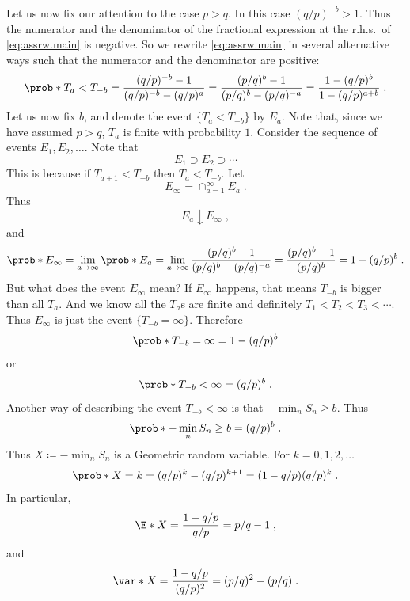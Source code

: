 Let us now fix our attention to the case $p>q$. In this case $(q/p)^{-b}>1$. Thus the numerator and the denominator of the fractional expression at the r.h.s.\ of \eqref{eq:assrw.main} is negative. So we rewrite \eqref{eq:assrw.main} in several alternative ways such that the numerator and the denominator are positive:
\[
\prob*{T_a<T_{-b}} = \frac{(q/p)^{-b}-1}{(q/p)^{-b}-(q/p)^{a}} 
= \frac{(p/q)^{b}-1}{(p/q)^{b}-(p/q)^{-a}}
= \frac{1-(q/p)^{b}}{1-(q/p)^{a+b}} \;.
\]
Let us now fix $b$, and denote the event $\{T_a<T_{-b}\}$ by $E_a$. Note that, since we have assumed $p>q$, $T_a$ is finite with probability $1$. Consider the sequence of events $E_1,E_2,\ldots$. Note that
\[
E_1\supset E_2\supset\cdots
\]
This is because if $T_{a+1}<T_{-b}$ then $T_a<T_{-b}$. Let 
\[
E_\infty = \cap_{a=1}^\infty E_a\;.
\]
Thus 
\[
E_a \downarrow E_\infty\;,
\]
and 
\[
\prob*{E_\infty} 
= \lim_{a\to\infty} \prob*{E_a} 
= \lim_{a\to\infty} \frac{(p/q)^{b}-1}{(p/q)^{b}-(p/q)^{-a}} 
= \frac{(p/q)^{b}-1}{(p/q)^{b}} 
= 1 - (q/p)^b\;. 
\]
But what does the event $E_\infty$ mean? If $E_\infty$ happens, that means $T_{-b}$ is bigger than all $T_a$. And we know all the $T_a$s are finite and definitely $T_1<T_2<T_3<\cdots$. Thus $E_\infty$ is just the event $\{T_{-b}=\infty\}$. Therefore
\[
\prob*{T_{-b}=\infty} = 1 - (q/p)^b
\]
or 
\[
\prob*{T_{-b}<\infty} = (q/p)^b\;.
\]
Another way of describing the event $T_{-b}<\infty$ is that $-\min_n S_n \geq b$.
Thus
\[
\prob*{-\min_n S_n\geq b} = (q/p)^b\;.
\]
Thus $X \coloneqq -\min_n S_n$ is a Geometric random variable. For $k=0,1,2,\ldots$
\[
\prob*{X = k} = (q/p)^{k} - (q/p)^{k+1} = (1-q/p)(q/p)^k\;.
\]
In particular,
\[
\E*{X} = \frac{1-q/p}{q/p} = p/q - 1\;,
\]
and 
\[
\var*{X} = \frac{1-q/p}{(q/p)^2} = (p/q)^2 - (p/q)\;.
\]

\newpage

